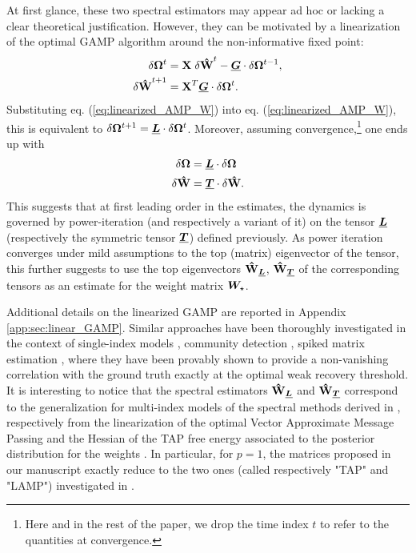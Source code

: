 At first glance, these two spectral estimators may appear ad hoc or lacking a clear theoretical justification. However, they can be motivated by a linearization of the optimal GAMP algorithm around the non-informative fixed point:
\begin{align} \label{eq:linearized_AMP}
    \delta\boldsymbol{\Omega}^t &= \boldsymbol{\mathbf{X}}\;\delta\boldsymbol{\mathbf{\hat{W}}}^t - {\underline{\bm{G}}}\cdot\delta\boldsymbol{\Omega}^{t-1},\\\label{eq:linearized_AMP_W}
    \delta\boldsymbol{\mathbf{\hat{W}}}^{t+1} &= \boldsymbol{\mathbf{X}}^T{\underline{\bm{G}}}\cdot\delta\boldsymbol{\Omega}^t. 
\end{align}
Substituting eq. (\ref{eq:linearized_AMP_W}) into eq. (\ref{eq:linearized_AMP_W}), this is equivalent to $\delta\boldsymbol{\Omega}^{t+1} = {\underline{\bm{L}}}\cdot\delta\boldsymbol{\Omega}^t$. Moreover, assuming convergence,\footnote{Here and in the rest of the paper, we drop the time index $t$ to refer to the quantities at convergence.} one ends up with
\begin{align}
    \delta\boldsymbol{\Omega} &= {\underline{\bm{L}}} \cdot  \delta\boldsymbol{\Omega} \\
    \delta\boldsymbol{\mathbf{\hat{W}}} &= {\underline{\bm{T}}}\cdot\delta\boldsymbol{\mathbf{\hat{W}}}.
\end{align}
This suggests that at first leading order in the estimates, the dynamics is governed by power-iteration (and respectively a variant of it) on the tensor ${\underline{\bm{L}}}$ (respectively  the symmetric tensor ${\underline{\bm{T}}}$) defined previously. As power iteration converges under mild assumptions to the top (matrix) eigenvector of the tensor, this further suggests to use the top eigenvectors $\boldsymbol{\mathbf{\hat{W}}}_{{\underline{\bm{L}}}}$, $\boldsymbol{\mathbf{\hat{W}}}_{{\underline{\bm{T}}}}$ of the corresponding tensors as an estimate for the weight matrix $\bm{W}_{\star}$.

Additional details on the linearized GAMP are reported in Appendix \ref{app:sec:linear_GAMP}.
Similar approaches have been thoroughly investigated in the context of single-index models \cite{mondelli18a, maillard22a}, community detection \cite{krzakala2013spectral, saade2014spectral}, spiked matrix estimation \cite{lesieur2017constrained, aubin2019spiked}, where they have been provably shown to provide a non-vanishing correlation with the ground truth exactly at the optimal weak recovery threshold. It is interesting to notice that the spectral estimators $\boldsymbol{\mathbf{\hat{W}}}_{{\underline{\bm{L}}}}$ and $\boldsymbol{\mathbf{\hat{W}}}_{{\underline{\bm{T}}}}$ correspond to the generalization for multi-index models of the spectral methods derived in \cite{maillard22a}, respectively from the linearization of the optimal Vector Approximate Message Passing \cite{schniter_vgamp_2016,rangan_vgamp_2017} and the Hessian of the TAP free energy associated to the posterior distribution for the weights \cite{saade2014spectral}. In particular, for $p\!=\!1$, the matrices proposed in our manuscript exactly reduce to the two ones (called respectively "TAP" and "LAMP") investigated in \cite{maillard22a}.

